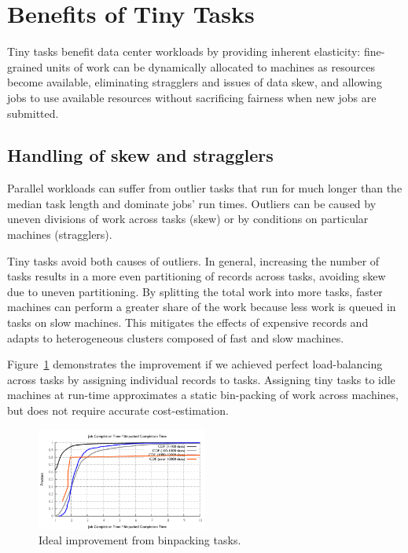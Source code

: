 \section{Benefits of Tiny Tasks}
\label{sec:benefits}
Tiny tasks benefit data center workloads by providing inherent elasticity:
fine-grained units of work can be dynamically allocated to machines as
resources become available, eliminating stragglers and issues of data skew,
and allowing jobs to use available resources without sacrificing fairness
when new jobs are submitted.

\subsection{Handling of skew and stragglers}
Parallel workloads can suffer from outlier tasks that run for much longer than the median task length and dominate jobs' run times.
Outliers can be caused by uneven divisions of work across tasks (skew) or by conditions on particular machines (stragglers).


Tiny tasks avoid both causes of outliers.
In general, increasing the number of tasks results in a more even partitioning of records across tasks, avoiding skew due to uneven partitioning.
By splitting the total work into more tasks, faster machines can perform a greater share of the work because less work is queued in tasks on slow machines.
This mitigates the effects of expensive records and adapts to heterogeneous clusters composed of fast and slow machines.

Figure~\ref{fig:binpacked} demonstrates the improvement if we
achieved perfect load-balancing across tasks by assigning individual records to tasks.
Assigning tiny tasks to idle machines at run-time approximates a static bin-packing of work across machines, but does not require accurate cost-estimation.

\begin{figure}[t]
\centering
\hspace{2ex}
\includegraphics[width=0.5\textwidth]{figures/binpacked1-sep}
\vspace{-4ex}
\caption{Ideal improvement from binpacking tasks.}
\vspace{-2ex}
\label{fig:binpacked}
\end{figure}

